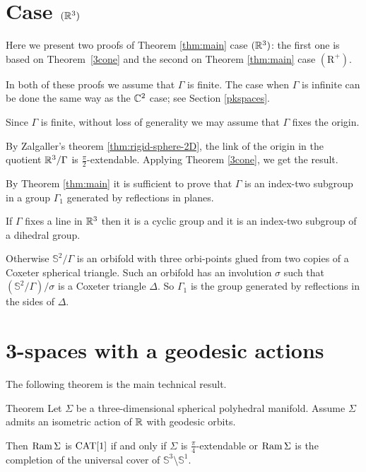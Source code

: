 \documentclass[oneside,a4paper]{article}
\begin{document}
\section{Case $(\mathbb{R}^3)$}\label{3R}

Here we present two proofs of Theorem \ref{thm:main} case $(\mathbb{R}^3)$: 
the first one is based on Theorem~\ref{3cone} and the second 
on Theorem \ref{thm:main} case $(\mathrm{R}^+)$.

In both of these proofs we assume that $\Gamma$ is finite.
The case when $\Gamma$ is infinite can be done the same way as the $\mathbb{C}^2$ case;
see Section \ref{pkspaces}.


Since $\Gamma$ is finite, 
without loss of generality we may assume that $\Gamma$ fixes the origin.

By Zalgaller's theorem \ref{thm:rigid-sphere-2D}, the link of the origin in the 
quotient $\mathbb{R}^3/\Gamma$ is $\tfrac\pi2$-extendable.
Applying Theorem \ref{3cone}, we get the result.
\qeds

By Theorem \ref{thm:main}
it is sufficient to prove that
$\Gamma$ is an index-two subgroup in a group $\Gamma_1$ generated by reflections in planes.

If $\Gamma$ fixes a line in $\mathbb{R}^3$ then it is a cyclic group and it is an index-two subgroup of
a dihedral group.

Otherwise $\mathbb{S}^2/\Gamma$ is an orbifold with three orbi-points glued
from two copies of a Coxeter spherical triangle.
Such an orbifold has an involution
$\sigma$ such that $(\mathbb{S}^2/\Gamma)/\sigma$ is a Coxeter triangle $\Delta$. So $\Gamma_1$
is the group generated by reflections in the sides of $\Delta$.
\qeds


\section{3-spaces with a geodesic actions}

The following theorem is the main technical result.

\begin{thm}{Theorem}\label{thm:3D-sphere}
Let $\Sigma$ be a three-dimensional spherical polyhedral manifold.
Assume $\Sigma$ admits an isometric action of $\mathbb{R}$ with geodesic orbits.

Then $\mathop{\rm Ram}\nolimits\Sigma$ is $\mathrm{CAT}[1]$ if and only if  $\Sigma$ is $\frac\pi4$-extendable
or $\mathop{\rm Ram}\nolimits\Sigma$ is the completion of the universal cover of $\mathbb{S}^3\setminus \mathbb{S}^1$.
\end{thm}
\end{document}
